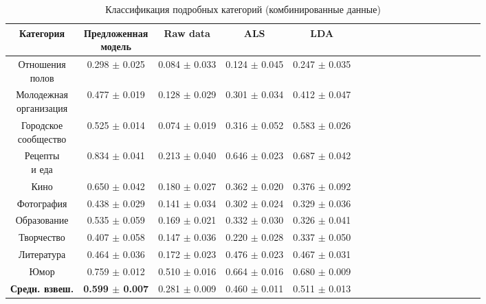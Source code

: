 \documentclass[times,specification,annotation]{itmo-student-thesis}
\begin{document}
\begin{table}[!h]
\caption{Классификация подробных категорий (комбинированные данные)}\label{tab-combined-d}
\centering
\begin{tabular}{|*{18}{c|}}\hline
Категория & \thead{Предложенная \\  модель}  & Raw data & ALS & LDA  \\\hline
\thead{Отношения  \\ полов}                   
											 & 0.298 $\pm$ 0.025 & 0.084 $\pm$ 0.033 & 0.124 $\pm$ 0.045 & 0.247 $\pm$ 0.035  \\\hline
\thead{Молодежная \\ организация}   
											 & 0.477 $\pm$ 0.019 & 0.128 $\pm$ 0.029 & 0.301 $\pm$ 0.034 & 0.412 $\pm$ 0.047  \\\hline
\thead{Городское \\ сообщество}                        
											 & 0.525 $\pm$ 0.014 & 0.074 $\pm$ 0.019 & 0.316 $\pm$ 0.052 & 0.583 $\pm$ 0.026  \\\hline
\thead{Рецепты \\ и еда}        
											 & 0.834 $\pm$ 0.041 & 0.213 $\pm$ 0.040 & 0.646 $\pm$ 0.023 & 0.687 $\pm$ 0.042  \\\hline
Кино                      				 & 0.650 $\pm$ 0.042 & 0.180 $\pm$ 0.027 & 0.362 $\pm$ 0.020 & 0.376 $\pm$ 0.092  \\\hline
Фотография                      & 0.438 $\pm$ 0.029 & 0.141 $\pm$ 0.034 & 0.302 $\pm$ 0.024 & 0.329 $\pm$ 0.036  \\\hline
Образование                     & 0.535 $\pm$ 0.059 & 0.169 $\pm$ 0.021 & 0.332 $\pm$ 0.030 & 0.326 $\pm$ 0.041  \\\hline
Творчество                        & 0.407 $\pm$ 0.058 & 0.147 $\pm$ 0.036 & 0.220 $\pm$ 0.028 & 0.337 $\pm$ 0.050  \\\hline
Литература                       & 0.464 $\pm$ 0.036 & 0.172 $\pm$ 0.023 & 0.476 $\pm$ 0.023 & 0.467 $\pm$ 0.031  \\\hline
Юмор                                  & 0.759 $\pm$ 0.012 & 0.510 $\pm$ 0.016 & 0.664 $\pm$ 0.016 & 0.680 $\pm$ 0.009  \\\hline
\textbf{Средн. взвеш.} & \textbf{0.599 $\pm$ 0.007} & 0.281 $\pm$ 0.009 & 0.460 $\pm$ 0.011 & 0.511 $\pm$ 0.013  \\\hline
\end{tabular}
\end{table}
\end{document}
